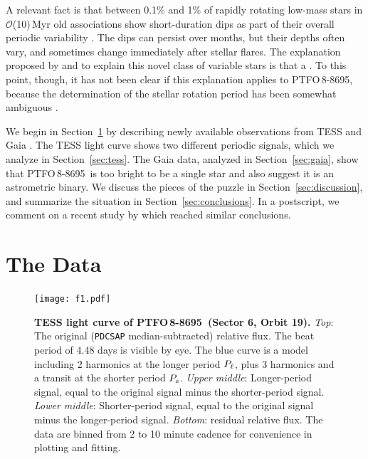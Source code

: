 \documentclass[12pt,twocolumn,tighten]{aastex62}
\newcommand{\ptfo}{PTFO$\,$8-8695}
\begin{document}
A relevant fact is that between 0.1\% and 1\% of rapidly rotating
low-mass stars in $\mathcal{O}$(10)$\,$Myr old associations show
short-duration dips as part of their overall periodic variability
\citep{rebull_usco_2018}.  The dips can persist over months, but their
depths often vary, and sometimes change immediately after stellar
flares.  The explanation proposed by \citet{stauffer_orbiting_2017}
and \citet{david_transient_2017} to explain this novel class of
variable stars is that a .  To this point, though,
it has not been clear if this explanation applies to \ptfo, because
the determination of the stellar rotation period has been somewhat
ambiguous
\citep{van_eyken_ptf_2012,koen_multicolour_2015,raetz_yeti_2016}.

We begin in Section~\ref{sec:observations} by describing newly
available observations from TESS \citep{ricker_transiting_2015} and
Gaia \citep{gaia_collaboration_gaia_2018}.  The TESS light curve shows
two different periodic signals, which we analyze in
Section~\ref{sec:tess}.  The Gaia data, analyzed in
Section~\ref{sec:gaia}, show that \ptfo\ is too bright to be a single
star and also suggest it is an astrometric binary.  We discuss the
pieces of the puzzle in Section~\ref{sec:discussion}, and summarize
the situation in Section~\ref{sec:conclusions}.  In a postscript, we
comment on a recent study by \citet{koen_2020} which reached similar
conclusions.


\section{The Data}
\label{sec:observations}

\begin{figure}[t!]
	\begin{center}
		\leavevmode
		\texttt{[image: f1.pdf]}
	\end{center}
	\vspace{-0.7cm}
	\caption{
    {\bf TESS light curve of \ptfo\ (Sector 6, Orbit 19).} {\it Top}:
    The original (\texttt{PDCSAP} median-subtracted) relative flux.
    The beat period of 4.48 days is visible by eye.  The blue curve is
    a model including 2 harmonics at the longer period $P_{\rm \ell}$,
    plus 3 harmonics and a transit at the shorter period $P_{\rm s}$.
    {\it Upper middle}: Longer-period signal, equal to the original
    signal minus the shorter-period signal.  {\it Lower middle}:
    Shorter-period signal, equal to the original signal minus the
    longer-period signal.  {\it Bottom}: residual relative flux.  The
    data are binned from 2 to 10 minute cadence for convenience in
    plotting and fitting.
		\label{fig:splitsignal}
	}
\end{figure}
\end{document}
